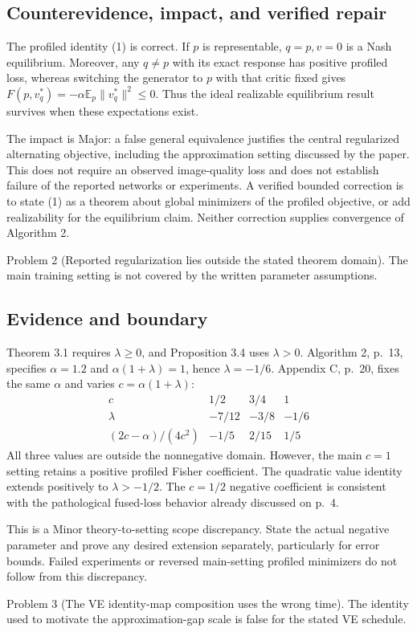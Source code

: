 \documentclass[10pt]{article}
\begin{document}
\subsection*{Counterevidence, impact, and verified repair}
The profiled identity (1) is correct. If \(p\) is representable, \(q=p,v=0\) is a Nash equilibrium. Moreover, any \(q\ne p\) with its exact response has positive profiled loss, whereas switching the generator to \(p\) with that critic fixed gives \(F(p,v_q^*)=-\alpha\mathbb E_p\|v_q^*\|^2\leq0\). Thus the ideal realizable equilibrium result survives when these expectations exist.\par
The impact is Major: a false general equivalence justifies the central regularized alternating objective, including the approximation setting discussed by the paper. This does not require an observed image-quality loss and does not establish failure of the reported networks or experiments. A verified bounded correction is to state (1) as a theorem about global minimizers of the profiled objective, or add realizability for the equilibrium claim. Neither correction supplies convergence of Algorithm 2.\par
Problem 2 (Reported regularization lies outside the stated theorem domain).  The main training setting is not covered by the written parameter assumptions.\par
\subsection*{Evidence and boundary}
Theorem 3.1 requires \(\lambda\geq0\), and Proposition 3.4 uses \(\lambda>0\). Algorithm 2, p. 13, specifies \(\alpha=1.2\) and \(\alpha(1+\lambda)=1\), hence \(\lambda=-1/6\). Appendix C, p. 20, fixes the same \(\alpha\) and varies \(c=\alpha(1+\lambda)\): \[\begin{array}{c|ccc}
c&1/2&3/4&1\\ \hline
\lambda&-7/12&-3/8&-1/6\\
(2c-\alpha)/(4c^2)&-1/5&2/15&1/5
\end{array}\] All three values are outside the nonnegative domain. However, the main \(c=1\) setting retains a positive profiled Fisher coefficient. The quadratic value identity extends positively to \(\lambda>-1/2\). The \(c=1/2\) negative coefficient is consistent with the pathological fused-loss behavior already discussed on p. 4.\par
This is a Minor theory-to-setting scope discrepancy. State the actual negative parameter and prove any desired extension separately, particularly for error bounds. Failed experiments or reversed main-setting profiled minimizers do not follow from this discrepancy.\par
Problem 3 (The VE identity-map composition uses the wrong time).  The identity used to motivate the approximation-gap scale is false for the stated VE schedule.\par
\end{document}
